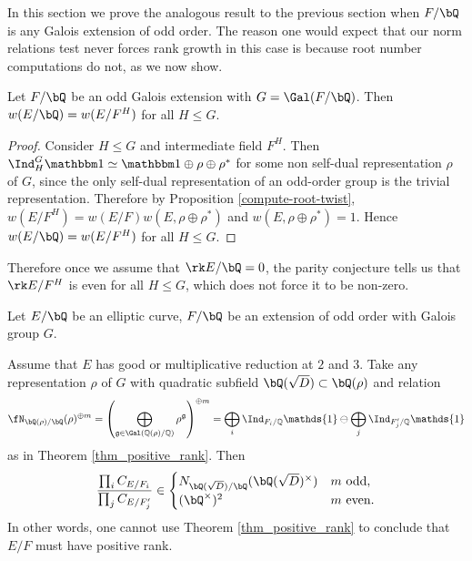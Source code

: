 
In this section we prove the analogous result to the previous section when $F / \bQ$ is any Galois extension of odd order. The reason one would expect that our norm relations test never forces rank growth in this case is because root number computations do not, as we now show.

\begin{lemma}
 Let $F / \bQ$ be an odd Galois extension with $G = \Gal(F / \bQ)$. Then $w(E / \bQ) = w(E / F^H)$ for all $H \leq G$. 
\end{lemma}

\begin{proof}
Consider $H \leq G$ and intermediate field $F^H$. Then 
$\Ind_H^G \trivial \simeq \trivial \oplus 
\rho \oplus \rho^*$ for some non self-dual representation $\rho$ of $G$, since the only self-dual representation of an odd-order group is the trivial representation. Therefore by Proposition \ref{compute-root-twist}, $w(E / F^H) = w(E / F)w(E, \rho \oplus \rho^*)$ and $w(E, \rho \oplus \rho^*) = 1$. Hence $w(E / \bQ) = w(E / F^H)$ for all $H \leq G$. 
\end{proof}

Therefore once we assume that $\rk E / \bQ = 0$, the parity conjecture tells us that $\rk E / F^H$ is even for all $H \leq G$, which does not force it to be non-zero. 


\begin{thm}\label{odd-exts}
 Let $E / \bQ$ be an elliptic curve, $F / \bQ$ be an extension of odd order with Galois group $G$. 
 
Assume that $E$ has good or multiplicative reduction at $2$ and $3$. 
Take any representation $\rho$ of $G$ with quadratic subfield $\bQ(\sqrt{D}) \subset \bQ(\rho)$ and relation
\begin{equation*}\label{odd-exp} \repnorm{\rho}^{\oplus m} =
 \left(\bigoplus_{\mathfrak{g}\in\Gal(\QQ(\rho)/\QQ)}\rho^{\mathfrak{g}}\right)^{\oplus m }=\bigoplus_i\Ind_{F_i/\QQ}\mathds{1}\ominus\bigoplus_j\Ind_{F'_j/\QQ}\mathds{1}
\end{equation*}
 as in Theorem \ref{thm_positive_rank}. Then
 \[ \frac{\prod_i C_{E/F_i}}{\prod_j C_{E/F_j'}}  \in 
    \begin{cases}
        N_{\bQ(\sqrt{D}) / \bQ}(\bQ(\sqrt{D})^{\times}) & m \ \text{odd}, \\
        (\bQ^{\times})^2 & m \ \text{even}.
    \end{cases} \] 
    In other words, one cannot use Theorem \ref{thm_positive_rank} to conclude that $E / F$ must have positive rank. 
\end{thm}

